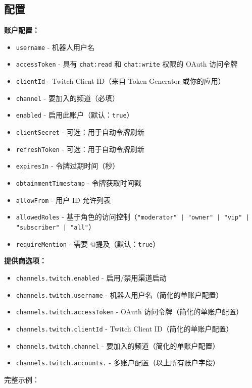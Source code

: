 \subsection{配置}


\textbf{账户配置：}

\begin{itemize}
  \item \texttt{username} - 机器人用户名
  \item \texttt{accessToken} - 具有 \texttt{chat:read} 和 \texttt{chat:write} 权限的 OAuth 访问令牌
  \item \texttt{clientId} - Twitch Client ID（来自 Token Generator 或你的应用）
  \item \texttt{channel} - 要加入的频道（必填）
  \item \texttt{enabled} - 启用此账户（默认：\texttt{true}）
  \item \texttt{clientSecret} - 可选：用于自动令牌刷新
  \item \texttt{refreshToken} - 可选：用于自动令牌刷新
  \item \texttt{expiresIn} - 令牌过期时间（秒）
  \item \texttt{obtainmentTimestamp} - 令牌获取时间戳
  \item \texttt{allowFrom} - 用户 ID 允许列表
  \item \texttt{allowedRoles} - 基于角色的访问控制（\texttt{"moderator" | "owner" | "vip" | "subscriber" | "all"}）
  \item \texttt{requireMention} - 需要 @提及（默认：\texttt{true}）
\end{itemize}


\textbf{提供商选项：}

\begin{itemize}
  \item \texttt{channels.twitch.enabled} - 启用/禁用渠道启动
  \item \texttt{channels.twitch.username} - 机器人用户名（简化的单账户配置）
  \item \texttt{channels.twitch.accessToken} - OAuth 访问令牌（简化的单账户配置）
  \item \texttt{channels.twitch.clientId} - Twitch Client ID（简化的单账户配置）
  \item \texttt{channels.twitch.channel} - 要加入的频道（简化的单账户配置）
  \item \texttt{channels.twitch.accounts.} - 多账户配置（以上所有账户字段）
\end{itemize}


完整示例：


